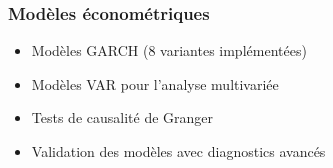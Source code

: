 \subsubsection{Modèles économétriques}
\begin{itemize}
    \item Modèles GARCH (8 variantes implémentées)
    \item Modèles VAR pour l'analyse multivariée
    \item Tests de causalité de Granger
    \item Validation des modèles avec diagnostics avancés
\end{itemize}
